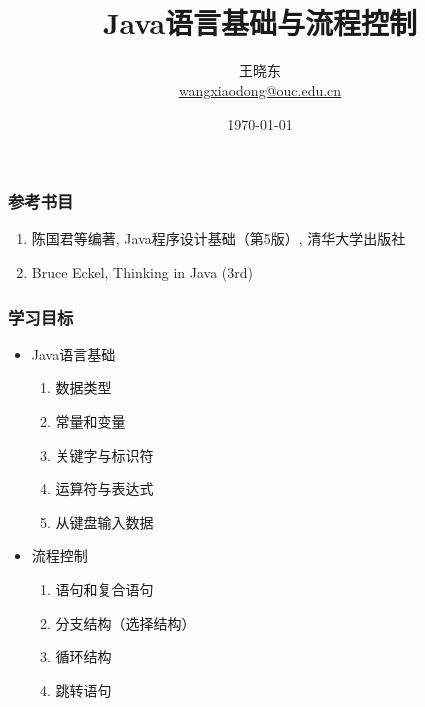 
\title[Wang Xiaodong]{\\  
  Java语言基础与流程控制}
\author[王晓东]{王晓东\\
  \href{mailto:wangxiaodong@ouc.edu.cn}{\footnotesize wangxiaodong@ouc.edu.cn}}
\date{\today}


 \frame{\titlepage}

\begin{frame}
\frametitle{参考书目}
\begin{enumerate}
\item 陈国君等编著, Java程序设计基础（第5版）, 清华大学出版社
\item Bruce Eckel, Thinking in Java (3rd)
\end{enumerate}  
\end{frame}

\begin{frame}
  \frametitle{学习目标}
  \begin{itemize}
  \item {\hei\Blue Java语言基础}

    \begin{enumerate}
    \item 数据类型
    \item 常量和变量
    \item 关键字与标识符
    \item 运算符与表达式
    \item 从键盘输入数据
    \end{enumerate}

  \item {\hei\Blue 流程控制}
    \begin{enumerate}
    \item 语句和复合语句
    \item 分支结构（选择结构）
    \item 循环结构
    \item 跳转语句
    \end{enumerate}
  \end{itemize}
\end{frame}

